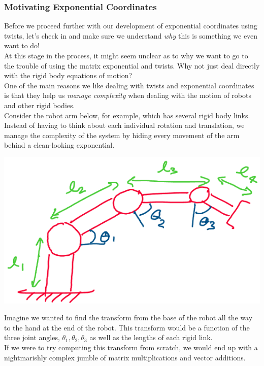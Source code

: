 \documentclass[oneside]{book}
\begin{document}
\subsubsection{Motivating Exponential Coordinates}
Before we proceed further with our development of exponential coordinates using twists, let's check in and make sure we understand \textit{why} this is something we even want to do!\\
At this stage in the process, it might seem unclear as to why we want to go to the trouble of using the matrix exponential and twists. Why not just deal directly with the rigid body equations of motion?\\
One of the main reasons we like dealing with twists and exponential coordinates is that they help us \textit{manage complexity} when dealing with the motion of robots and other rigid bodies.\\
Consider the robot arm below, for example, which has several rigid body links.\\
Instead of having to think about each individual rotation and translation, we manage the complexity of the system by hiding every movement of the arm behind a clean-looking exponential.
\begin{center}
    \includegraphics[scale=0.4]{images/manipulator_arm.png}
\end{center}
Imagine we wanted to find the transform from the base of the robot all the way to the hand at the end of the robot. This transform would be a function of the three joint angles, $\theta_1, \theta_2, \theta_3$ as well as the lengths of each rigid link.\\
If we were to try computing this transform from scratch, we would end up with a nightmarishly complex jumble of matrix multiplications and vector additions.\\
\end{document}

